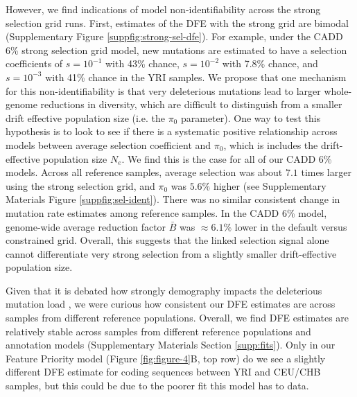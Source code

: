 \documentclass[11pt]{article}
\begin{document}
However, we find indications of model non-identifiability across the strong selection grid runs. First, estimates of the DFE with the strong grid are
bimodal (Supplementary Figure \ref{suppfig:strong-sel-dfe}). For
example, under the CADD 6\% strong selection grid model, new mutations are
estimated to have a selection coefficients of $s = 10^{-1}$ with 43\% chance,
$s=10^{-2}$ with 7.8\% chance, and $s=10^{-3}$ with 41\% chance in the YRI
samples. We propose that one mechanism for this non-identifiability is that
very deleterious mutations lead to larger whole-genome reductions in diversity, which are
difficult to distinguish from a smaller drift effective population size (i.e.
the $\pi_0$ parameter). One way to test this hypothesis is to look to see if
there is a systematic positive relationship across models between average
selection coefficient and $\pi_0$, which is includes the drift-effective
population size $N_e$. We find this is the case for all of our CADD 6\% models. Across all reference samples, average selection was about $7.1$ times larger using the strong
selection grid, and $\pi_0$ was $5.6\%$ higher (see Supplementary Materials
Figure \ref{suppfig:sel-ident}). There was no similar consistent change in
mutation rate estimates among reference samples. In the CADD 6\% model, genome-wide
average reduction factor $\bar{B}$ was $\approx 6.1\%$ lower in the default
versus constrained grid. Overall, this suggests that the linked selection
signal alone cannot differentiate very strong selection from a slightly smaller
drift-effective population size. 

Given that it is debated how strongly demography impacts the deleterious
mutation load
\parencite{Torres2018-ni,Torres2020-hc,Lohmueller2008-qi,Simons2014-sv,Simons2016-cs},
we were curious how consistent our DFE estimates are across samples from different reference populations. Overall, we find DFE estimates are relatively stable across samples from different reference populations and annotation models (Supplementary Materials Section \ref{supp:fits}). Only in our Feature
Priority model (Figure \ref{fig:figure-4}B, top row) do we see a slightly
different DFE estimate for coding sequences between YRI and CEU/CHB
samples, but this could be due to the poorer fit this model has to data.
\end{document}
